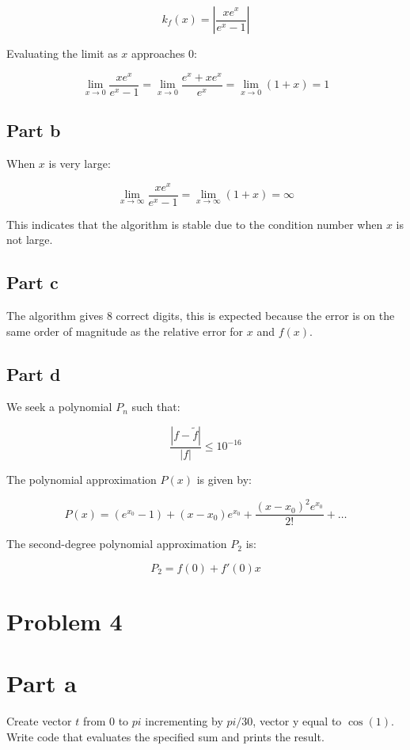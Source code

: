 \documentclass[12pt]{article}
\begin{document}
\[
k_{f}(x) = \left| \frac{x e^x}{e^x - 1} \right|
\]

Evaluating the limit as \( x \) approaches 0:

\[
\lim_{x \to 0} \frac{x e^x}{e^x - 1} = \lim_{x \to 0} \frac{e^x + x e^x}{e^x} = \lim_{x \to 0} (1 + x) = 1
\]

\subsection*{Part b}

When \( x \) is very large:

\[
\lim_{x \to \infty} \frac{x e^x}{e^x - 1} = \lim_{x \to \infty} (1 + x) = \infty
\]

This indicates that the algorithm is stable due to the condition number when \( x \) is not large.

\subsection*{Part c}

The algorithm gives 8 correct digits, this is expected because the error is on the same order of magnitude as the relative error for \( x \) and \( f(x) \).

\subsection*{Part d}

We seek a polynomial \( P_n \) such that:

\[
\frac{|f - \tilde{f}|}{|f|} \leq 10^{-16}
\]

The polynomial approximation \( P(x) \) is given by:

\[
P(x) = (e^{x_0} - 1) + (x - x_0)e^{x_0} + \frac{(x - x_0)^2 e^{x_0}}{2!} + \ldots
\]

The second-degree polynomial approximation \( P_2 \) is:

\[
P_2 = f(0) + f'(0) x
\]

\section*{Problem 4}

\section*{Part a}

Create vector $t$ from $0$ to $pi$ incrementing by $pi/30$, vector y equal to $\cos(1)$. Write code that evaluates the specified sum and prints the result.
\end{document}
